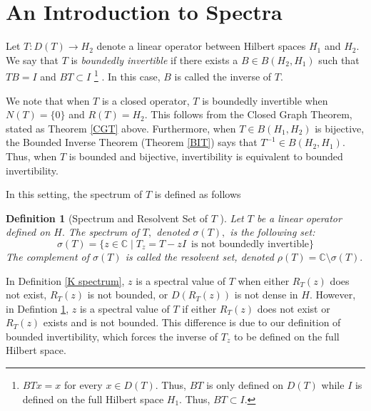 \documentclass[12pt,a4paper]{article}
\theoremstyle{boldthm}
\theoremstyle{bolddefn}
\newtheorem{definition}[theorem]{Definition}
\begin{document}


\section{An Introduction to Spectra}

Let $T:D(T) \rightarrow H_2$ denote a linear operator between Hilbert spaces $H_1$ and $H_2.$ We say that $T$ is \textit{boundedly invertible} if there exists a $B \in B(H_2, H_1)$ such that $TB = I$ and $BT \subset I$ \footnote{$BTx=x$ for every $x \in D(T).$ Thus, $BT$ is only defined on $D(T)$ while $I$ is defined on the full Hilbert space $H_1.$ Thus, $BT \subset I.$} \cite{Matt}. In this case, $B$ is called the inverse of $T.$

We note that when $T$ is a closed operator, $T$ is boundedly invertible when $N(T) = \{0\}$ and $R(T) = H_2.$ This follows from the Closed Graph Theorem, stated as Theorem \ref{CGT} above. Furthermore, when $T \in B(H_1, H_2)$ is bijective, the Bounded Inverse Theorem (Theorem \ref{BIT}) says that $T^{-1}\in B(H_2, H_1).$ Thus, when $T$ is bounded and bijective, invertibility is equivalent to bounded invertibility. 

In this setting, the spectrum of $T$ is defined as follows 
\begin{definition}[Spectrum and Resolvent Set of $T$ \cite{Matt}] \label{BI spec}
    Let $T$ be a linear operator defined on $H.$ The spectrum of $T,$ denoted $\sigma(T),$ is the following set:
    \begin{equation}
        \sigma(T) = \{ z \in \mathbb{C} \mid T_z = T - zI \, \text{ is not boundedly invertible} \}
    \end{equation}
    The complement of $\sigma(T)$ is called the resolvent set, denoted $\rho(T) = \mathbb{C} \setminus \sigma(T).$
\end{definition}
In Definition \ref{K spectrum}, $z$ is a spectral value of $T$ when either $R_T(z)$ does not exist, $R_T(z)$ is not bounded, or $D(R_T(z))$ is not dense in $H.$ However, in Defintion \ref{BI spec}, $z$ is a spectral value of $T$ if either $R_T(z)$ does not exist or $R_T(z)$ exists and is not bounded. This difference is due to our definition of bounded invertibility, which forces the inverse of $T_z$ to be defined on the full Hilbert space.
\end{document}
